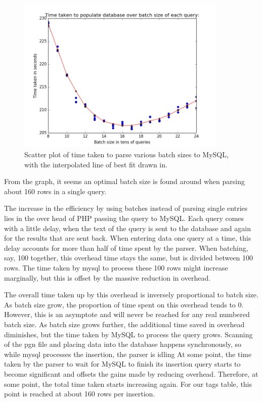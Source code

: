 \documentclass{article}
\begin{document}
\begin{figure}[h]
	\includegraphics[width=10cm]{graph_batch_interpolation}
	\caption{Scatter plot of time taken to parse various batch sizes to
	MySQL, with the interpolated line of best fit drawn in.}
	\label{figure:1}
\end{figure}

From the graph, it seems an optimal batch size is found around when parsing
about 160 rows in a single query.

The increase in the efficiency by using batches instead of parsing single
entries lies in the over head of PHP passing the query to MySQL.  Each
query comes with a little delay, when the text of the query is sent to the
database and again for the results that are sent back.  When entering data
one query at a time, this delay accounts for more than half of time spent
by the parser.  When batching, say, 100 together, this overhead time stays
the same, but is divided between 100 rows.  The time taken by mysql to
process these 100 rows might increase marginally, but this is offset by the
massive reduction in overhead.

The overall time taken up by this overhead is inversely proportional to
batch size.  As batch size grow, the proportion of time spent on this
overhead tends to
0. However, this is an asymptote and will never be reached for any real
numbered batch size.  As batch size grows further, the additional time
saved in overhead diminishes, but the time taken by MySQL to process the
query grows.  Scanning of the pgn file and placing data into the database
happens synchronously, so while mysql processes the insertion, the parser is
idling  At some point, the time taken by the parser to wait for MySQL to
finish its insertion query starts to become significant and offsets the
gains made by reducing overhead.  Therefore, at some point, the total time
taken starts increasing again.  For our tags table, this point is reached
at about 160 rows per insertion.
\end{document}
